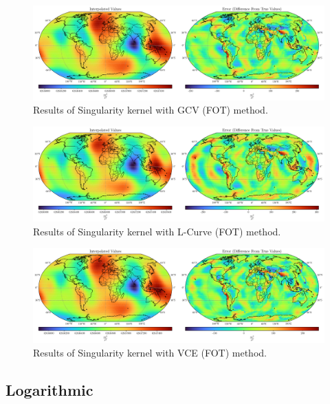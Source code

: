 \documentclass[12pt]{article}
\begin{document}
	\clearpage
	
	\begin{figure}[h!]
		\centering
		\includegraphics[width=16cm]{../Outputs/Plots/Plot_Singularity_GCV.pdf}
		\caption{Results of Singularity kernel with GCV (FOT) method.}
		\label{fig:Singularity_GCV}
	\end{figure}
	
	\begin{figure}[h!]
		\centering
		\includegraphics[width=16cm]{../Outputs/Plots/Plot_Singularity_L-Curve.pdf}
		\caption{Results of Singularity kernel with L-Curve (FOT) method.}
		\label{fig:Singularity_L-Curve}
	\end{figure}
	
	\begin{figure}[h!]
		\centering
		\includegraphics[width=16cm]{../Outputs/Plots/Plot_Singularity_VCE.pdf}
		\caption{Results of Singularity kernel with VCE (FOT) method.}
		\label{fig:Singularity_VCE}
	\end{figure}
	
	\subsection{Logarithmic}
	
\end{document}
